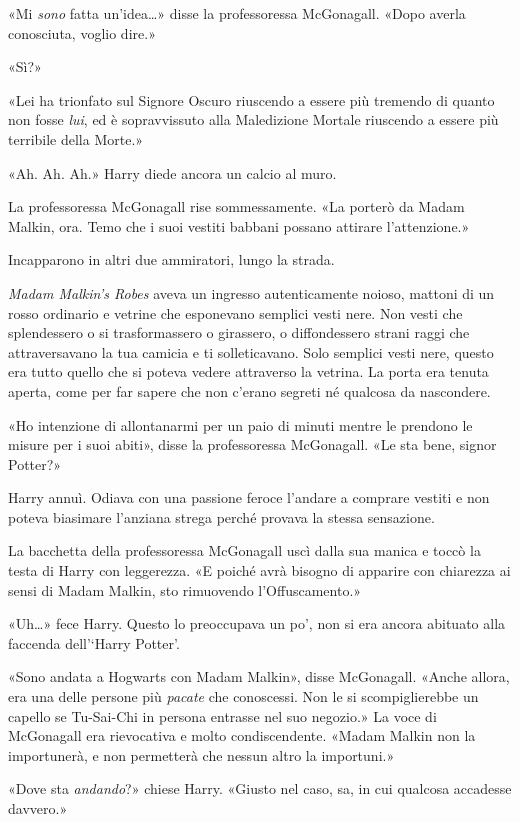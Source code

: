 «Mi \textit{sono} fatta un’idea…» disse la professoressa McGonagall. «Dopo averla conosciuta, voglio dire.»

«Sì?»

«Lei ha trionfato sul Signore Oscuro riuscendo a essere più tremendo di quanto non fosse \textit{lui}, ed è sopravvissuto alla Maledizione Mortale riuscendo a essere più terribile della Morte.»

«Ah. Ah. Ah.» Harry diede ancora un calcio al muro.

La professoressa McGonagall rise sommessamente. «La porterò da Madam Malkin, ora. Temo che i suoi vestiti babbani possano attirare l’attenzione.»

Incapparono in altri due ammiratori, lungo la strada.

\textit{Madam Malkin’s Robes} aveva un ingresso autenticamente noioso, mattoni di un rosso ordinario e vetrine che esponevano semplici vesti nere. Non vesti che splendessero o si trasformassero o girassero, o diffondessero strani raggi che attraversavano la tua camicia e ti solleticavano. Solo semplici vesti nere, questo era tutto quello che si poteva vedere attraverso la vetrina. La porta era tenuta aperta, come per far sapere che non c’erano segreti né qualcosa da nascondere.

«Ho intenzione di allontanarmi per un paio di minuti mentre le prendono le misure per i suoi abiti», disse la professoressa McGonagall. «Le sta bene, signor Potter?»

Harry annuì. Odiava con una passione feroce l’andare a comprare vestiti e non poteva biasimare l’anziana strega perché provava la stessa sensazione.

La bacchetta della professoressa McGonagall uscì dalla sua manica e toccò la testa di Harry con leggerezza. «E poiché avrà bisogno di apparire con chiarezza ai sensi di Madam Malkin, sto rimuovendo l’Offuscamento.»

«Uh…» fece Harry. Questo lo preoccupava un po’, non si era ancora abituato alla faccenda dell’‘Harry Potter’.

«Sono andata a Hogwarts con Madam Malkin», disse McGonagall. «Anche allora, era una delle persone più \textit{pacate} che conoscessi. Non le si scompiglierebbe un capello se Tu-Sai-Chi in persona entrasse nel suo negozio.» La voce di McGonagall era rievocativa e molto condiscendente. «Madam Malkin non la importunerà, e non permetterà che nessun altro la importuni.»

«Dove sta \textit{andando}?» chiese Harry. «Giusto nel caso, sa, in cui qualcosa accadesse davvero.»

